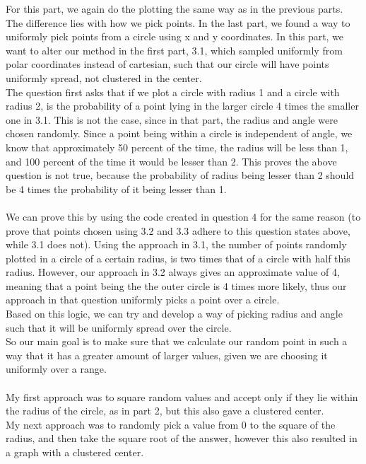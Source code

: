 \documentclass[addpoints]{exam}
\begin{document}
\begin{questions}
\newpage
\question
For this part, we again do the plotting the same way as in the previous parts. The difference lies with how we pick points. In the last part, we found a way to uniformly pick points from a circle using x and y coordinates. In this part, we want to alter our method in the first part, 3.1, which sampled uniformly from polar coordinates instead of cartesian, such that our circle will have points uniformly spread, not clustered in the center. \\
The question first asks that if we plot a circle with radius 1 and a circle with radius 2, is the probability of a point lying in the larger circle 4 times the smaller one in 3.1. This is not the case, since in that part, the radius and angle were chosen randomly. Since a point being within a circle is independent of angle, we know that approximately 50 percent of the time, the radius will be less than 1, and 100 percent of the time it would be lesser than 2. This proves the above question is not true, because the probability of radius being lesser than 2 should be 4 times the probability of it being lesser than 1. \\ \\
We can prove this by using the code created in question 4 for the same reason (to prove that points chosen using 3.2 and 3.3 adhere to this question states above, while 3.1 does not). Using the approach in 3.1, the number of points randomly plotted in a circle of a certain radius, is two times that of a circle with half this radius. However, our approach in 3.2 always gives an approximate value of 4, meaning that a point being the the outer circle is 4 times more likely, thus our approach in that question uniformly picks a point over a circle.\\
Based on this logic, we can try and develop a way of picking radius and angle such that it will be uniformly spread over the circle.\\
So our main goal is to make sure that we calculate our random point in such a way that it has a greater amount of larger values, given we are choosing it uniformly over a range.\\ \\
My first approach was to square random values and accept only if they lie within the radius of the circle, as in part 2, but this also gave a clustered center. \\
My next approach was to randomly pick a value from 0 to the square of the radius, and then take the square root of the answer, however this also resulted in a graph with a clustered center.\\

\end{questions}
\end{document}
